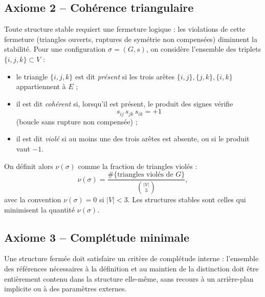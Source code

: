 \documentclass[11pt,a4paper]{article}
\begin{document}
\subsection*{Axiome 2 – Cohérence triangulaire}

Toute structure stable requiert une fermeture logique : les violations de cette fermeture (triangles ouverts, ruptures de symétrie non compensées) diminuent la stabilité. Pour une configuration \(\sigma = (G,s)\), on considère l’ensemble des triplets \(\{i,j,k\} \subset V\) :
\begin{itemize}
  \item le triangle \(\{i,j,k\}\) est dit \emph{présent} si les trois arêtes \(\{i,j\}, \{j,k\}, \{i,k\}\) appartiennent à \(E\) ;
  \item il est dit \emph{cohérent} si, lorsqu’il est présent, le produit des signes vérifie
  \[
  s_{ij}\, s_{jk}\, s_{ik} = +1
  \]
  (boucle sans rupture non compensée) ;
  \item il est dit \emph{violé} si au moins une des trois arêtes est absente, ou si le produit vaut \(-1\).
\end{itemize}

On définit alors \(\nu(\sigma)\) comme la fraction de triangles violés :
\[
\nu(\sigma) = \frac{\#\{\text{triangles violés de } G\}}{\binom{|V|}{3}},
\]
avec la convention \(\nu(\sigma) = 0\) si \(|V| < 3\). Les structures stables sont celles qui minimisent la quantité \(\nu(\sigma)\).

\subsection*{Axiome 3 – Complétude minimale}

Une structure fermée doit satisfaire un critère de complétude interne : l’ensemble des références nécessaires à la définition et au maintien de la distinction doit être entièrement contenu dans la structure elle-même, sans recours à un arrière-plan implicite ou à des paramètres externes. 
\end{document}

